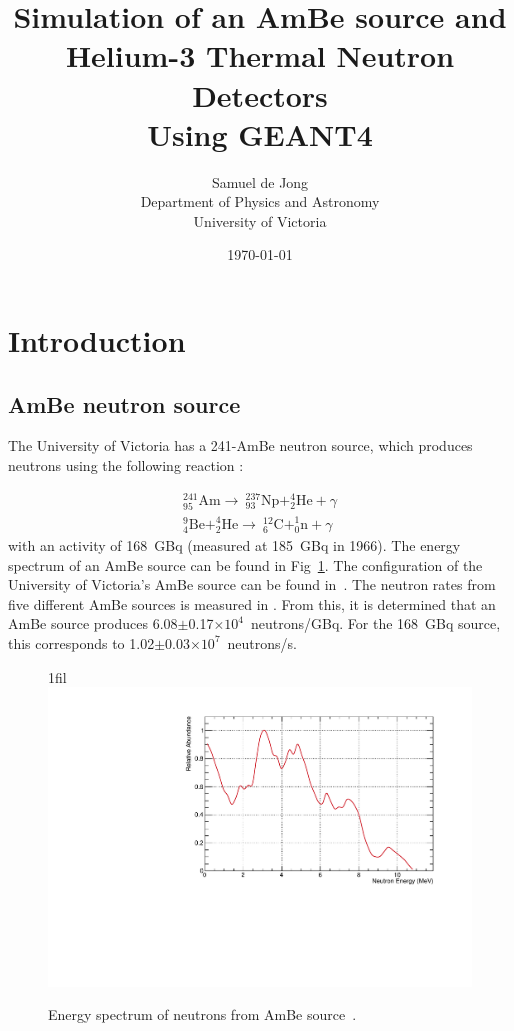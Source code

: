 \documentclass{article}
\title{Simulation of an AmBe source and Helium-3 Thermal Neutron Detectors\\ \vspace{2 mm} {\large Using GEANT4}}
\author{Samuel de Jong \\
	Department of Physics and Astronomy \\
	University of Victoria  \\
	}
\date{\today}
\makeatletter
\newcommand*{\centerfloat}{%
  \parindent \z@
  \leftskip \z@ \@plus 1fil \@minus \textwidth
  \rightskip\leftskip
  \parfillskip \z@skip}
\makeatother
\begin{document}
\maketitle

\section{Introduction}

\subsection{AmBe neutron source}
	The University of Victoria has a 241-AmBe neutron source, which produces neutrons using the following reaction \cite{barschall1983neutron}:

\begin{subequations}
\begin{align}
		{^{241}_{95}\mathrm{Am}\rightarrow~^{237}_{93}\mathrm{Np} + ^4_2\mathrm{He} + \gamma}\\
		{^9_4\mathrm{Be}+^4_2\mathrm{He}\rightarrow~^{12}_6\mathrm{C}+^1_0\mathrm{n}+\gamma}
\end{align}
\end{subequations}
with an activity of 168~GBq (measured at 185~GBq in 1966). The energy spectrum of an AmBe source can be found in Fig~\ref{fig:AmBeSpec}. The configuration of the University of Victoria's AmBe source can be found in~\cite{hargrove}. The neutron rates from five different AmBe sources is measured in \cite{lebreton2007experimental}. From this, it is determined that an AmBe source produces 6.08$\pm$0.17$\times10^{4}$~neutrons/GBq. For the 168~GBq source, this corresponds to 1.02$\pm$0.03$\times10^{7}$~neutrons/s.

\begin{figure}
	\centerfloat
		\includegraphics[trim={0 0 0 0.75cm},clip, width=\textwidth]{images/AmBe_NeutronSpectrum.pdf}
	\caption[Energy spectrum of neutrons from AmBe source]{Energy spectrum of neutrons from AmBe source~\cite{AmBeSpec}.}
	\label{fig:AmBeSpec}
\end{figure}
\end{document}
